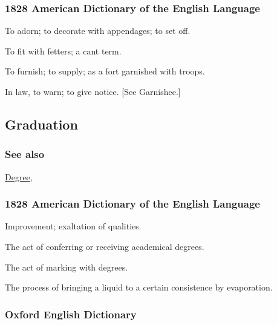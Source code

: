 		\subsubsection{1828 American Dictionary of the English Language}
		
			\begin{compactitem}
				\item[1] To adorn; to decorate with appendages; to set off.
				\item[2] To fit with fetters; a cant term.
				\item[3] To furnish; to supply; as a fort garnished with troops.
				\item[4] In law, to warn; to give notice. [See Garnishee.]
			\end{compactitem}
			
	\subsection{Graduation} %
		\label{GRADUATION}
		
		\subsubsection{See also}
		
			\hyperref[DEGREE]{Degree}, 
		
		\subsubsection{1828 American Dictionary of the English Language}
		
			\begin{compactitem}
				\item[1] Improvement; exaltation of qualities.
				\item[2] The act of conferring or receiving academical degrees.
				\item[3] The act of marking with degrees.
				\item[4] The process of bringing a liquid to a certain consistence by evaporation.
			\end{compactitem}
		
		\subsubsection{Oxford English Dictionary}
		
